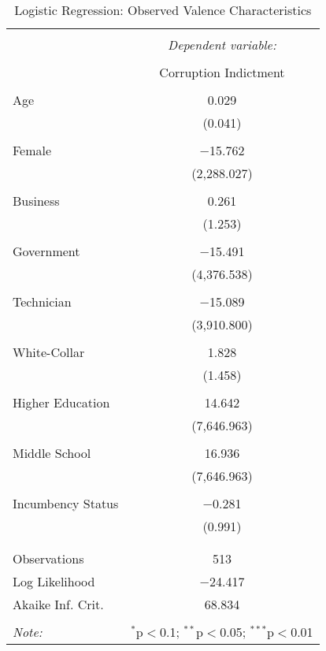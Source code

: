 \documentclass{article}
\begin{document}
\begin{table}[!htbp] \centering 
    \caption{Logistic Regression: Observed Valence Characteristics} 
    \label{} 
  \begin{tabular}{@{\extracolsep{5pt}}lc} 
  \\[-1.8ex]\hline 
  \hline \\[-1.8ex] 
   & \multicolumn{1}{c}{\textit{Dependent variable:}} \\ 
  \cline{2-2} 
  \\[-1.8ex] & Corruption Indictment \\ 
  \hline \\[-1.8ex] 
   Age & 0.029 \\ 
    & (0.041) \\ 
    & \\ 
   Female & $-$15.762 \\ 
    & (2,288.027) \\ 
    & \\ 
   Business & 0.261 \\ 
    & (1.253) \\ 
    & \\ 
   Government & $-$15.491 \\ 
    & (4,376.538) \\ 
    & \\ 
   Technician & $-$15.089 \\ 
    & (3,910.800) \\ 
    & \\ 
   White-Collar & 1.828 \\ 
    & (1.458) \\ 
    & \\ 
   Higher Education & 14.642 \\ 
    & (7,646.963) \\ 
    & \\ 
   Middle School & 16.936 \\ 
    & (7,646.963) \\ 
    & \\ 
   Incumbency Status & $-$0.281 \\ 
    & (0.991) \\ 
    & \\ 
  \hline \\[-1.8ex] 
  Observations & 513 \\ 
  Log Likelihood & $-$24.417 \\ 
  Akaike Inf. Crit. & 68.834 \\ 
  \hline 
  \hline \\[-1.8ex] 
  \textit{Note:}  & \multicolumn{1}{r}{$^{*}$p$<$0.1; $^{**}$p$<$0.05; $^{***}$p$<$0.01} \\ 
  \end{tabular} 
  \end{table} 
\end{document}
